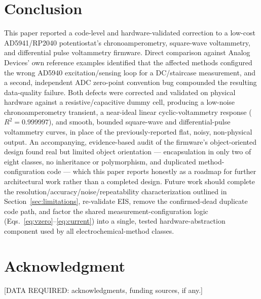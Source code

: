 \documentclass[journal]{IEEEtran}
\begin{document}
\section{Conclusion}
This paper reported a code-level and hardware-validated correction to a low-cost AD5941/RP2040 potentiostat's chronoamperometry, square-wave voltammetry, and differential pulse voltammetry firmware. Direct comparison against Analog Devices' own reference examples identified that the affected methods configured the wrong AD5940 excitation/sensing loop for a DC/staircase measurement, and a second, independent ADC zero-point convention bug compounded the resulting data-quality failure. Both defects were corrected and validated on physical hardware against a resistive/capacitive dummy cell, producing a low-noise chronoamperometry transient, a near-ideal linear cyclic-voltammetry response ($R^2=0.999997$), and smooth, bounded square-wave and differential-pulse voltammetry curves, in place of the previously-reported flat, noisy, non-physical output. An accompanying, evidence-based audit of the firmware's object-oriented design found real but limited object orientation --- encapsulation in only two of eight classes, no inheritance or polymorphism, and duplicated method-configuration code --- which this paper reports honestly as a roadmap for further architectural work rather than a completed design. Future work should complete the resolution/accuracy/noise/repeatability characterization outlined in Section~\ref{sec:limitations}, re-validate EIS, remove the confirmed-dead duplicate code path, and factor the shared measurement-configuration logic (Eqs.~\eqref{eq:vzero}--\eqref{eq:current}) into a single, tested hardware-abstraction component used by all electrochemical-method classes.

\section*{Acknowledgment}
[DATA REQUIRED: acknowledgments, funding sources, if any.]
\end{document}
